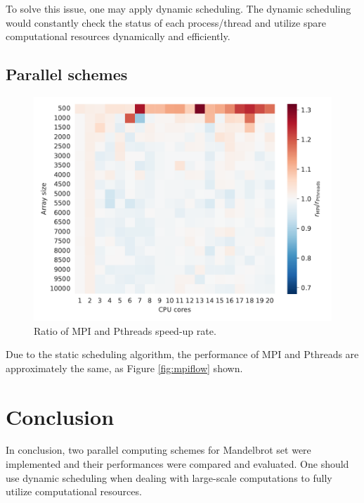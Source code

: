 \documentclass[twoside,12pt]{article}
\theoremstyle{definition}
\theoremstyle{remark}
\begin{document}
To solve this issue, one may apply dynamic scheduling.
The dynamic scheduling would constantly check the status of each process/thread
and utilize spare computational resources dynamically and efficiently.

\subsection{Parallel schemes}
\begin{figure}[t!]
    \centering
    \includegraphics[width=\textwidth]{../analysis/mpi2pth.pdf}
    \caption{Ratio of MPI and Pthreads speed-up rate.}
    \label{fig:mpi2pth}
\end{figure}
Due to the static scheduling algorithm, the performance of 
MPI and Pthreads are approximately the same, as Figure \ref{fig:mpiflow}
shown.



\section{Conclusion}
In conclusion, two parallel computing schemes for Mandelbrot set were implemented and
their performances were compared and evaluated.
One should use dynamic scheduling when dealing with large-scale computations
to fully utilize computational resources.

\appendix

\newpage
\end{document}
